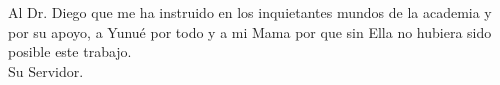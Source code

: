 \begin{dedication}
Al Dr. Diego que me ha instruido en los inquietantes mundos de la academia y por su apoyo, a Yunué por todo y a mi Mama por que sin Ella no hubiera sido posible este trabajo.\\
Su Servidor.
\end{dedication}
